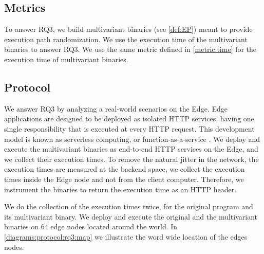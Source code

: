 
\subsection*{Metrics}

To answer RQ3, we build multivariant \wasm binaries (see \autoref{def:EP}) meant to provide execution path randomization.
We use the execution time of the multivariant binaries to answer RQ3. We use the same metric defined in \autoref{metric:time} for the execution time of multivariant binaries.

\subsection*{Protocol}


We answer RQ3 by analyzing a real-world scenarios on the Edge. 
Edge applications are designed to be deployed as isolated HTTP services, having one single responsibility that is executed at every HTTP request. This development model is known as serverless computing, or function-as-a-service \cite{shillaker2020faasm,Narayan2021Swivel}. 
We deploy and execute the multivariant binaries as end-to-end HTTP services on the Edge, and we collect their execution times.
To remove the natural jitter in the network, the execution times are measured at the backend space, \ie we collect the execution times inside the Edge node and not from the client computer. 
Therefore, we instrument the binaries to return the execution time as an HTTP header. 

We do the collection of the execution times twice, for the original program and its multivariant binary. We deploy and execute the original and the multivariant binaries on 64 edge nodes located around the world. In \autoref{diagrams:protocol:rq3:map} we illustrate the word wide location of the edges nodes.


